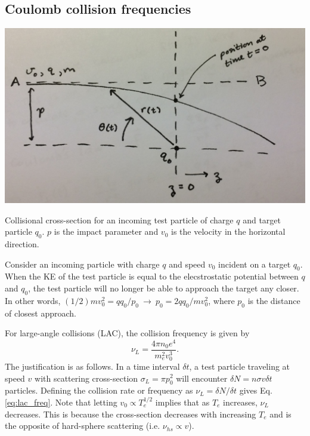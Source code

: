 	\subsection{Coulomb collision frequencies}
	\begin{marginfigure}
		\centering
		\includegraphics[width=\columnwidth]{figures/collisions.png}
		\caption{Collisional cross-section for an incoming test particle of charge $q$ and target particle $q_0$. $p$ is the impact parameter and $v_0$ is the velocity in the horizontal direction.}
		\label{fig:collisions}
	\end{marginfigure}

	Consider an incoming particle with charge $q$ and speed $v_0$ incident on a target $q_0$. When the KE of the test particle is equal to the elecstrostatic potential between $q$ and $q_0$, the test particle will no longer be able to approach the target any closer. In other words, $(1/2)mv_0^2=qq_0/p_0~\rightarrow~p_0=2qq_0/mv_0^2$, where $p_0$ is the distance of closest approach.

	For large-angle collisions (LAC), the collision frequency is given by 
	\begin{equation}
		\label{eq:lac_freq}
		\nu_L=\frac{4\pi n_0e^4}{m_e^2v_0^3}.
	\end{equation}
	The justification is as follows. In a time interval $\delta t$, a test particle traveling at speed $v$ with scattering cross-section $\sigma_L=\pi p_0^2$ will encounter $\delta N=n\sigma v\delta t$ particles. Defining the collision rate or frequency as $\nu_L=\delta N/\delta t$ gives Eq. \ref{eq:lac_freq}. Note that letting $v_0\propto T_e^{1/2}$ implies that as $T_e$ increases, $\nu_L$ decreases. This is because the cross-section decreases with increasing $T_e$ and is the opposite of hard-sphere scattering (i.e. $\nu_{hs}\propto v$).

